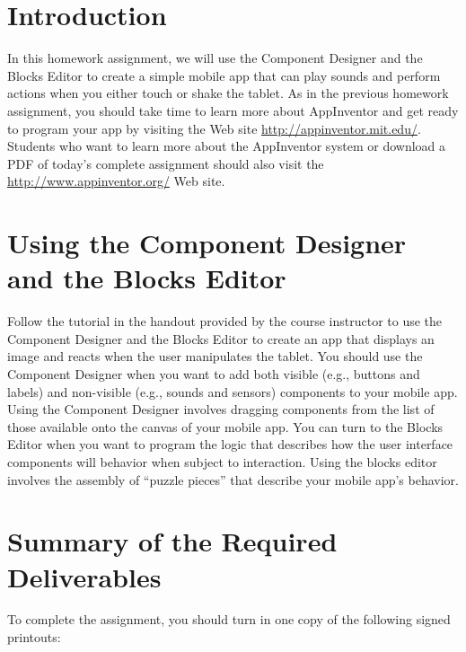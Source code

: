 	

\usepackage[compact]{titlesec}



\vspace*{-.1in}
\section*{Introduction}

In this homework assignment, we will use the Component Designer and the Blocks Editor to create a simple mobile app that
can play sounds and perform actions when you either touch or shake the tablet.  As in the previous homework assignment,
you should take time to learn more about AppInventor and get ready to program your app by visiting the Web site
\url{http://appinventor.mit.edu/}. Students who want to learn more about the AppInventor system or download a PDF of
today's complete assignment should also visit the \url{http://www.appinventor.org/} Web site.

\section*{Using the Component Designer and the Blocks Editor}

Follow the tutorial in the handout provided by the course instructor to use the Component Designer and the Blocks Editor
to create an app that displays an image and reacts when the user manipulates the tablet.  You should use the Component
Designer when you want to add both visible (e.g., buttons and labels) and non-visible (e.g., sounds and sensors)
components to your mobile app.  Using the Component Designer involves dragging components from the list of those
available onto the canvas of your mobile app.  You can turn to the Blocks Editor when you want to program the logic that
describes how the user interface components will behavior when subject to interaction. Using the blocks editor involves
the assembly of ``puzzle pieces'' that describe your mobile app's behavior.

\section*{Summary of the Required Deliverables}

\noindent
To complete the assignment, you should turn in one copy of the following signed printouts: 
\vspace*{-.1in}

